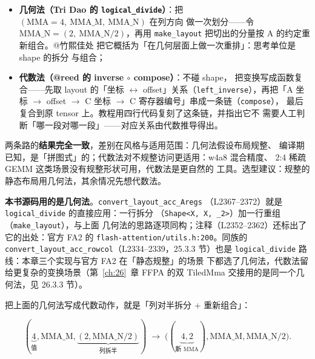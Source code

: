 \begin{itemize}[itemsep=2pt,topsep=2pt]
  \item \textbf{几何法（Tri Dao 的 \texttt{logical\_\allowbreak{}divide}）}：把
        $(\mathrm{MMA}{=}4,\ \mathrm{MMA\_M},\ \mathrm{MMA\_N})$ 在列方向
        做一次划分——令 $\mathrm{MMA\_N}=(2,\ \mathrm{MMA\_N}/2)$，再用
        \texttt{make\_layout} 把切出的分量按 A 的约定重新组合。@竹熙佳处
        把它概括为「在几何层面上做一次重排」：思考单位是 shape 的拆分
        与组合；
  \item \textbf{代数法（@reed 的 inverse $\circ$ compose）}：不碰 shape，
        把变换写成函数复合——先取 layout 的「坐标 $\leftrightarrow$
        offset」关系（\texttt{left\_\allowbreak{}inverse}），再把「A 坐标 $\to$ offset
        $\to$ C 坐标 $\to$ C 寄存器编号」串成一条链（\texttt{compose}），
        最后复合到原 tensor 上。教程用四行代码复刻了这条链，并指出它不
        需要人工判断「哪一段对哪一段」——对应关系由代数推导得出。
\end{itemize}

两条路的\textbf{结果完全一致}，差别在风格与适用范围：几何法假设布局规整、
编译期已知，是「拼图式」的；代数法对不规整访问更适用：w4a8 混合精度、
2:4 稀疏 GEMM 这类场景没有规整形状可用，代数法是更自然的
工具。选型建议：规整的静态布局用几何法，其余情况先想代数法。

\textbf{本书源码用的是几何法}。\texttt{convert\_\allowbreak{}layout\_\allowbreak{}acc\_\allowbreak{}Aregs}
（L2367--2372）就是 \texttt{logical\_\allowbreak{}divide} 的直接应用：一行拆分
（\texttt{Shape<X, X, \_2>}）加一行重组（\texttt{make\_layout}），与上面
几何法的思路逐项同构；注释（L2352--2362）还标出了它的出处：官方 FA2 的
\texttt{flash-attention/\allowbreak{}utils.\allowbreak{}h:200}。同族的
\texttt{convert\_\allowbreak{}layout\_\allowbreak{}acc\_\allowbreak{}rowcol}（L2334--2339，25.3.3 节）也是
\texttt{logical\_\allowbreak{}divide} 路线：本章三个实现与官方 FA2 在「静态规整」的场景
下都选了几何法，代数法留给更复杂的变换场景（第~\ref{ch:26}~章 FFPA
的双 TiledMma 交接用的是同一个几何法，见 26.3.3 节）。



把上面的几何法写成代数动作，就是「列对半拆分 + 重新组合」：

\begin{equation}
  (\underbrace{4}_{\text{值}}, \mathrm{MMA\_M}, \underbrace{(2, \mathrm{MMA\_N}/2)}_{\text{列拆半}})
  \;\longrightarrow\;
  \bigl((\underbrace{4,2}_{\text{新 MMA}}), \mathrm{MMA\_M}, \mathrm{MMA\_N}/2\bigr).
  \label{eq:25-aregs}
\end{equation}

